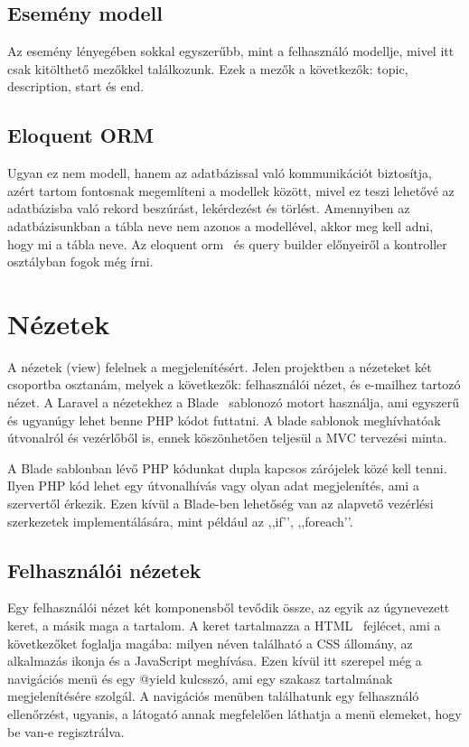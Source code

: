 \documentclass[
]{thesis-ekf}
\theoremstyle{definition}
\theoremstyle{remark}
\begin{document}
	\subsection{Esemény modell}
	Az esemény lényegében sokkal egyszerűbb, mint a felhasználó modellje, mivel itt csak kitölthető mezőkkel találkozunk. Ezek a mezők a következők: topic, description, start és end.
	
	\subsection{Eloquent ORM}
	Ugyan ez nem modell, hanem az adatbázissal való kommunikációt biztosítja, azért tartom fontosnak megemlíteni a modellek között, mivel ez teszi lehetővé az adatbázisba való rekord beszúrást, lekérdezést és törlést. Amennyiben az adatbázisunkban a tábla neve nem azonos a modellével, akkor meg kell adni, hogy mi a tábla neve. Az eloquent orm~\cite{laravel_eloquent} és query builder előnyeiről a kontroller osztályban fogok még írni.
	
	\section{Nézetek}
	A nézetek (view) felelnek a megjelenítésért. Jelen projektben a nézeteket két csoportba osztanám, melyek a következők: felhasználói nézet, és e-mailhez tartozó nézet. A Laravel a nézetekhez a Blade~\cite{laravel_blade} sablonozó motort használja, ami egyszerű és ugyanúgy lehet benne PHP kódot futtatni. A blade sablonok meghívhatóak útvonalról és vezérlőből is, ennek köszönhetően teljesül a MVC tervezési minta. 
	
	A Blade sablonban lévő PHP kódunkat dupla kapcsos zárójelek közé kell tenni. Ilyen PHP kód lehet egy útvonalhívás vagy olyan adat megjelenítés, ami a szervertől érkezik. Ezen kívül a Blade-ben lehetőség van az alapvető vezérlési szerkezetek implementálására, mint például az ,,if’’, ,,foreach’’.
	
	\subsection{Felhasználói nézetek}
	Egy felhasználói nézet két komponensből tevődik össze, az egyik az úgynevezett keret, a másik maga a tartalom. A keret tartalmazza a HTML~\cite{html_doc} fejlécet, ami a következőket foglalja magába: milyen néven található a CSS állomány, az alkalmazás ikonja és a JavaScript meghívása. Ezen kívül itt szerepel még a navigációs menü és egy @yield kulcsszó, ami egy szakasz tartalmának megjelenítésére szolgál. A navigációs menüben találhatunk egy felhasználó ellenőrzést, ugyanis, a látogató annak megfelelően láthatja a menü elemeket, hogy be van-e regisztrálva.
	
\end{document}
